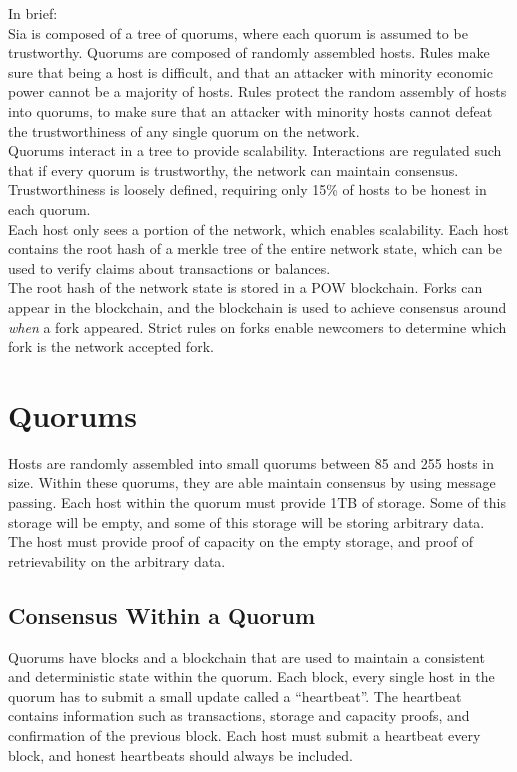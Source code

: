 \documentclass[twocolumn]{article}
\begin{document}
In brief: \\
Sia is composed of a tree of quorums, where each quorum is assumed to be trustworthy.
Quorums are composed of randomly assembled hosts.
Rules make sure that being a host is difficult, and that an attacker with minority economic power cannot be a majority of hosts.
Rules protect the random assembly of hosts into quorums, to make sure that an attacker with minority hosts cannot defeat the trustworthiness of any single quorum on the network. \\
Quorums interact in a tree to provide scalability.
Interactions are regulated such that if every quorum is trustworthy, the network can maintain consensus.
Trustworthiness is loosely defined, requiring only 15\% of hosts to be honest in each quorum. \\
Each host only sees a portion of the network, which enables scalability.
Each host contains the root hash of a merkle tree of the entire network state, which can be used to verify claims about transactions or balances. \\
The root hash of the network state is stored in a POW blockchain.
Forks can appear in the blockchain, and the blockchain is used to achieve consensus around \textit{when} a fork appeared.
Strict rules on forks enable newcomers to determine which fork is the network accepted fork.

\section{Quorums}
Hosts are randomly assembled into small quorums between 85 and 255 hosts in size.
Within these quorums, they are able maintain consensus by using message passing.
Each host within the quorum must provide 1TB of storage.
Some of this storage will be empty, and some of this storage will be storing arbitrary data.
The host must provide proof of capacity on the empty storage, and proof of retrievability on the arbitrary data.

\subsection{Consensus Within a Quorum}
Quorums have blocks and a blockchain that are used to maintain a consistent and deterministic state within the quorum.
Each block, every single host in the quorum has to submit a small update called a ``heartbeat''.
The heartbeat contains information such as transactions, storage and capacity proofs, and confirmation of the previous block.
Each host must submit a heartbeat every block, and honest heartbeats should always be included.
\end{document}
